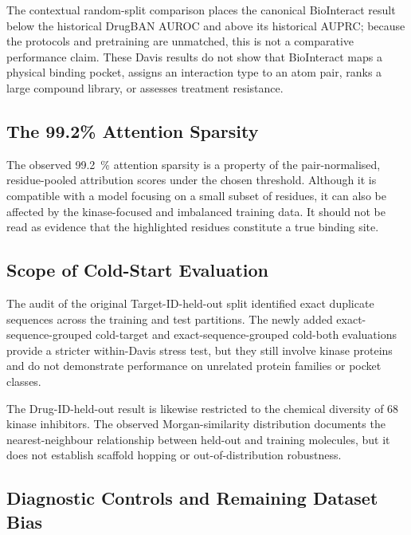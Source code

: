 \documentclass[fleqn,10pt]{wlscirep}
\begin{document}
The contextual random-split comparison places the canonical BioInteract result
below the historical DrugBAN AUROC and above its historical AUPRC; because the
protocols and pretraining are unmatched, this is not a comparative performance
claim. These Davis results do not show that
BioInteract maps a physical binding pocket, assigns an interaction type to an
atom pair, ranks a large compound library, or assesses treatment resistance.

\subsection{The 99.2\% Attention Sparsity}

The observed \SI{99.2}{\percent} attention sparsity is a property of the
\begingroup\color{red}pair-normalised, residue-pooled\endgroup{} attribution scores under the chosen threshold.  Although it is
compatible with a model focusing on a small subset of residues, it can also be
affected by the kinase-focused and imbalanced training data.  It should not be
read as evidence that the highlighted residues constitute a true binding site.

\begingroup\color{red}
\subsection{Scope of Cold-Start Evaluation}

The audit of the original \begingroup\color{red}Target-ID-held-out\endgroup{} split identified exact duplicate
sequences across the training and test partitions. The newly added exact-sequence-grouped
cold-target and \begingroup\color{red}exact-sequence-grouped\endgroup{} cold-both evaluations provide a stricter within-Davis stress
test, but they still involve kinase proteins and do not demonstrate performance
on unrelated protein families or pocket classes.

The \begingroup\color{red}Drug-ID-held-out\endgroup{} result is likewise restricted to the chemical diversity of 68
kinase inhibitors.  The observed Morgan-similarity distribution documents the
nearest-neighbour relationship between held-out and training molecules, but it
does not establish scaffold hopping or out-of-distribution robustness.

\begingroup\color{red}
\subsection{Diagnostic Controls and Remaining Dataset Bias}
\end{document}
